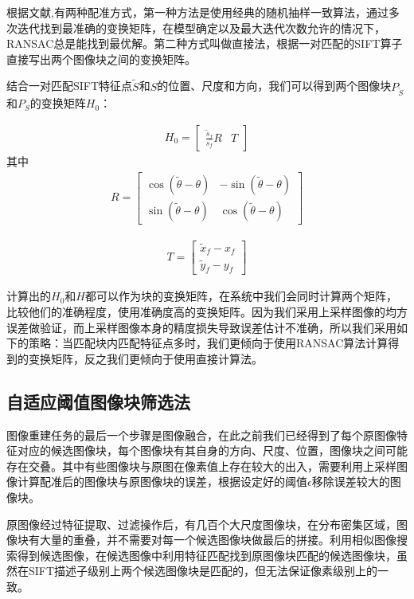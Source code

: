 \documentclass[UTF8]{csoarticle}
\begin{document}
根据文献\cite{Dai:2012vn},有两种配准方式，第一种方法是使用经典的随机抽样一致算法，通过多次迭代找到最准确的变换矩阵，在模型确定以及最大迭代次数允许的情况下，RANSAC总是能找到最优解。第二种方式叫做直接法，根据一对匹配的SIFT算子直接写出两个图像块之间的变换矩阵。

结合一对匹配SIFT特征点\(\tilde{S}\)和\(S\)的位置、尺度和方向，我们可以得到两个图像块\(P_{\tilde{S}}\)和\(P_S\)的变换矩阵\(H_0\)：

\begin{align}
  H_0 = 
  \begin{bmatrix}
  \frac{\tilde{s}_f}{s_f} R & T
  \end{bmatrix}
\end{align}
其中
\begin{align}
  R = 
  \begin{bmatrix}
    \cos{(\tilde{\theta}-\theta)} & -\sin{(\tilde{\theta}-\theta)} \\
    \sin{(\tilde{\theta}-\theta)} & \cos{(\tilde{\theta}-\theta)} 
  \end{bmatrix}
\end{align}

\begin{align}
  T = 
  \begin{bmatrix}
    \tilde{x}_f - x_f \\
    \tilde{y}_f - y_f
  \end{bmatrix}
\end{align}

计算出的\(H_0\)和\(H\)都可以作为块的变换矩阵，在系统中我们会同时计算两个矩阵，比较他们的准确程度，使用准确度高的变换矩阵。因为我们采用上采样图像的均方误差做验证，而上采样图像本身的精度损失导致误差估计不准确，所以我们采用如下的策略：当匹配块内匹配特征点多时，我们更倾向于使用RANSAC算法计算得到的变换矩阵，反之我们更倾向于使用直接计算法。

\subsection{自适应阈值图像块筛选法}
图像重建任务的最后一个步骤是图像融合，在此之前我们已经得到了每个原图像特征对应的候选图像块，每个图像块有其自身的方向、尺度、位置，图像块之间可能存在交叠。其中有些图像块与原图在像素值上存在较大的出入，需要利用上采样图像计算配准后的图像块与原图像块的误差，根据设定好的阈值\(\epsilon\)移除误差较大的图像块。

原图像经过特征提取、过滤操作后，有几百个大尺度图像块，在分布密集区域，图像块有大量的重叠，并不需要对每一个候选图像块做最后的拼接。利用相似图像搜索得到候选图像，在候选图像中利用特征匹配找到原图像块匹配的候选图像块，虽然在SIFT描述子级别上两个候选图像块是匹配的，但无法保证像素级别上的一致。
\end{document}
